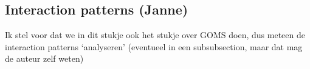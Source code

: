 \subsection{Interaction patterns (Janne)}
Ik stel voor dat we in dit stukje ook het stukje over GOMS doen, dus meteen de interaction patterns `analyseren' (eventueel in een subsubsection, maar dat mag de auteur zelf weten)